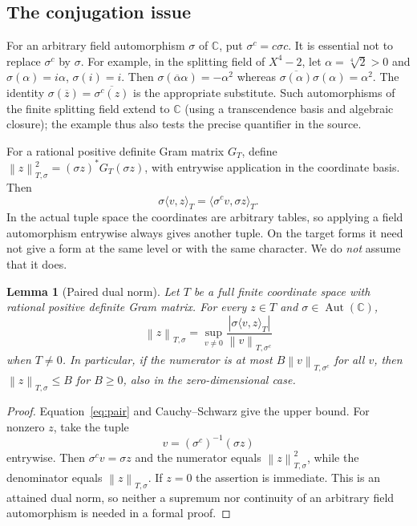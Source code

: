 \documentclass[11pt]{article}
\newtheorem{lemma}[theorem]{Lemma}
\theoremstyle{remark}\newtheorem{remark}[theorem]{Remark}
\newcommand{\C}{\mathbb C}\newcommand{\Z}{\mathbb Z}\newcommand{\Q}{\mathbb Q}
\newcommand{\abs}[1]{\left|#1\right|}\newcommand{\norm}[1]{\left\|#1\right\|}
\begin{document}
\subsection{The conjugation issue}

For an arbitrary field automorphism $\sigma$ of $\C$, put $\sigma^c=c\sigma c$. It is essential not to replace $\sigma^c$ by $\sigma$. For example, in the splitting field of $X^4-2$, let $\alpha=\sqrt[4]{2}>0$ and $\sigma(\alpha)=i\alpha$, $\sigma(i)=i$. Then $\sigma(\overline\alpha\alpha)=-\alpha^2$ whereas $\overline{\sigma(\alpha)}\sigma(\alpha)=\alpha^2$. The identity $\sigma(\overline z)=\overline{\sigma^c(z)}$ is the appropriate substitute. Such automorphisms of the finite splitting field extend to $\C$ (using a transcendence basis and algebraic closure); the example thus also tests the precise quantifier in the source.

For a rational positive definite Gram matrix $G_T$, define $\norm{z}_{T,\sigma}^2=(\sigma z)^*G_T(\sigma z)$, with entrywise application in the coordinate basis. Then
\begin{equation}\label{eq:pair}
 \sigma\langle v,z\rangle_T=\langle\sigma^c v,\sigma z\rangle_T.
\end{equation}
In the actual tuple space the coordinates are arbitrary tables, so applying a field automorphism entrywise always gives another tuple. On the target forms it need not give a form at the same level or with the same character. We do \emph{not} assume that it does.

\begin{lemma}[Paired dual norm]\label{lem:dual}
Let $T$ be a full finite coordinate space with rational positive definite Gram matrix. For every $z\in T$ and $\sigma\in\operatorname{Aut}(\C)$,
\[
 \norm{z}_{T,\sigma}=
 \sup_{v\ne0}\frac{\abs{\sigma\langle v,z\rangle_T}}{\norm{v}_{T,\sigma^c}}
\]
when $T\ne0$. In particular, if the numerator is at most $B\norm{v}_{T,\sigma^c}$ for all $v$, then $\norm{z}_{T,\sigma}\le B$ for $B\ge0$, also in the zero-dimensional case.
\end{lemma}
\begin{proof}
Equation~\eqref{eq:pair} and Cauchy--Schwarz give the upper bound. For nonzero $z$, take the tuple
\begin{equation}\label{eq:test}
 v=(\sigma^c)^{-1}(\sigma z)
\end{equation}
entrywise. Then $\sigma^c v=\sigma z$ and the numerator equals $\norm{z}_{T,\sigma}^2$, while the denominator equals $\norm{z}_{T,\sigma}$. If $z=0$ the assertion is immediate. This is an attained dual norm, so neither a supremum nor continuity of an arbitrary field automorphism is needed in a formal proof.
\end{proof}
\end{document}
